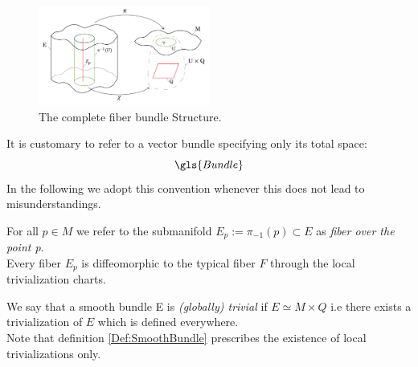 \documentclass[Main]{subfiles}
\begin{document}
			\begin{figure}[h!]
  				\caption{The complete fiber bundle Structure.}
  				\includegraphics[width=0.5\textwidth]{Pictures/FiberBundle}
  				\centering
			\end{figure}
			\begin{notationfix}
				It is customary to refer to a vector bundle specifying only its total space:
				\begin{displaymath}
					\gls{Bundle}%
				\end{displaymath}
			 	In the following we adopt this convention whenever this does not lead to misunderstandings.
			\end{notationfix}
			
			\begin{observation}
				For all $p\in M$ we refer to the submanifold $E_{p} := \pi_{-1}(p) \subset E $ as \emph{fiber over the point p}.
				\\
				Every fiber $E_p$ is diffeomorphic to the typical fiber $F$ through the local trivialization charts.
			\end{observation}
			
			\begin{notationfix}
				We say that a smooth bundle E is \emph{(globally) trivial} if $E \simeq M \times Q$ i.e there exists a trivialization of $E$ which is defined everywhere.
				\\
				Note that definition \ref{Def:SmoothBundle}  prescribes the existence of local trivializations only.
			\end{notationfix}
			
\end{document}
